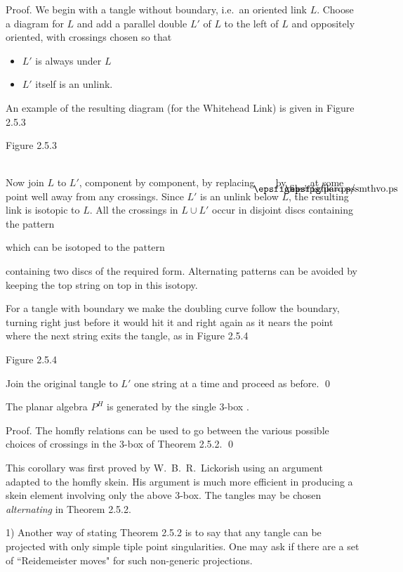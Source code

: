 \bs
{\sc Proof.} We begin with a tangle without boundary, i.e.~an
oriented link $L$. Choose a diagram for $L$ and add a parallel
double $L'$ of $L$ to the left of $L$ and oppositely oriented, with
crossings chosen so that

\begin{itemize}
\item[a)] $L'$ is always under $L$

\item[b)] $L'$  itself is an unlink.
\end{itemize}
An example of the resulting diagram (for the Whitehead Link) is
given in Figure 2.5.3
\[
	
\]
\begin{center}
	Figure 2.5.3
\end{center}
\ni Now join $L$ to $L'$, component by component, by replacing
$\paro$  by $\smthvo$, at some point well away from any crossings. 
Since $L'$ is
an unlink below $L$, the resulting link is isotopic to $L$. 
All the crossings in $L\cup L'$ occur in disjoint discs containing the pattern
 
which can be isotoped to the pattern
 
containing two discs of the required form. 
Alternating patterns can be
avoided by keeping the top string on top in this isotopy.

For a tangle with boundary we make the doubling curve follow the
boundary, turning right just before it would hit it and right
again as it nears the point where the next string exits the
tangle, as in Figure 2.5.4
\[
	
\]
\begin{center}
	Figure 2.5.4
\end{center}
\ni Join the original tangle to $L'$ one string at a time and
proceed as before. \qed

\bs{} The planar algebra $P^H$ is generated by
the single 3-box .

\bs
{\sc Proof.} The {\sc homfly} relations can be used to go between
the various possible choices of crossings in the 3-box of Theorem
2.5.2. \qed

\bs This corollary was first proved  by W.~B.~R.~Lickorish using an
argument adapted to the {\sc homfly} skein. His argument is much
more efficient in producing a skein element involving only the
above 3-box. The tangles may be chosen
{\it alternating} in Theorem 2.5.2.

 1) Another way of stating Theorem 2.5.2 is to say
that any tangle can be projected with only simple tiple point
singularities.  One may ask if there are a set of ``Reidemeister
moves" for such non-generic projections.

